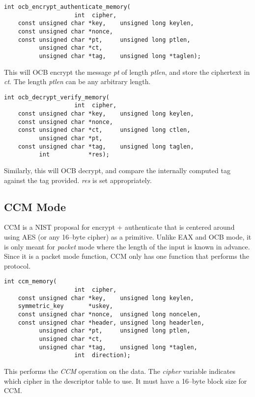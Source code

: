 \documentclass[synpaper]{book}
\begin{document}
\begin{verbatim}
int ocb_encrypt_authenticate_memory(
                    int  cipher,
    const unsigned char *key,    unsigned long keylen,
    const unsigned char *nonce,
    const unsigned char *pt,     unsigned long ptlen,
          unsigned char *ct,
          unsigned char *tag,    unsigned long *taglen);
\end{verbatim}

This will OCB encrypt the message \textit{pt} of length \textit{ptlen}, and store the ciphertext in \textit{ct}.  The length \textit{ptlen}
can be any arbitrary length.

\begin{verbatim}
int ocb_decrypt_verify_memory(
                    int  cipher,
    const unsigned char *key,    unsigned long keylen,
    const unsigned char *nonce,
    const unsigned char *ct,     unsigned long ctlen,
          unsigned char *pt,
    const unsigned char *tag,    unsigned long taglen,
          int           *res);
\end{verbatim}

Similarly, this will OCB decrypt, and compare the internally computed tag against the tag provided. \textit{res} is set
appropriately.

\subsection{CCM Mode}
CCM is a NIST proposal for encrypt + authenticate that is centered around using AES (or any 16--byte cipher) as a primitive.  Unlike EAX and OCB mode,
it is only meant for \textit{packet} mode where the length of the input is known in advance.  Since it is a packet mode function, CCM only has one
function that performs the protocol.

\begin{verbatim}
int ccm_memory(
                    int  cipher,
    const unsigned char *key,    unsigned long keylen,
    symmetric_key       *uskey,
    const unsigned char *nonce,  unsigned long noncelen,
    const unsigned char *header, unsigned long headerlen,
          unsigned char *pt,     unsigned long ptlen,
          unsigned char *ct,
          unsigned char *tag,    unsigned long *taglen,
                    int  direction);
\end{verbatim}

This performs the \textit{CCM} operation on the data.  The \textit{cipher} variable indicates which cipher in the descriptor table to use.  It must have a
16--byte block size for CCM.
\end{document}
